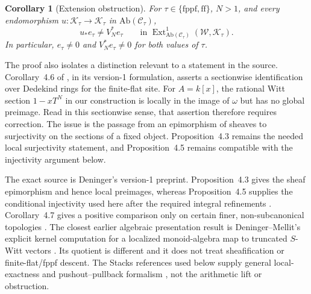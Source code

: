 \documentclass[11pt]{article}
\newtheorem{corollary}[theorem]{Corollary}
\theoremstyle{definition}
\newcommand{\Ext}{\operatorname{Ext}}
\newcommand{\Wsh}{\mathcal W}
\newcommand{\Ksh}{\mathcal K}
\newcommand{\ff}{\mathrm{ff}}
\newcommand{\fppf}{\mathrm{fppf}}
\begin{document}
\begin{corollary}[Extension obstruction]\label{cor:ext}
For \(\tau\in\{\fppf,\ff\}\), \(N>1\), and every endomorphism
\(u\colon\Ksh_\tau\to\Ksh_\tau\) in
\(\mathrm{Ab}(\mathscr C_\tau)\),
\[
 u_*e_\tau\ne V_N^*e_\tau
 \qquad\text{in }
 \Ext^1_{\mathrm{Ab}(\mathscr C_\tau)}(\Wsh,\Ksh_\tau).
\]
In particular, \(e_\tau\ne0\) and \(V_N^*e_\tau\ne0\) for both values of
\(\tau\).
\end{corollary}

The proof also isolates a distinction relevant to a statement in the
source.  Corollary~4.6 of
\cite[p.~23]{Deninger2025Rational}, in its version-1 formulation, asserts a
sectionwise identification over Dedekind rings for the finite-flat site.
For \(A=k[x]\), the rational Witt section \(1-xT^N\) in our construction is
locally in the image of \(\omega\) but has no global preimage.  Read in this
sectionwise sense, that assertion therefore requires correction.  The
issue is the passage from an epimorphism of sheaves to surjectivity on the
sections of a fixed object.  Proposition~4.3 remains the needed local
surjectivity statement, and Proposition~4.5 remains compatible with the
injectivity argument below.

The exact source is Deninger's version-1 preprint.
Proposition~4.3 gives the sheaf epimorphism and hence local preimages,
whereas Proposition~4.5 supplies the conditional injectivity used here
after the required integral refinements
\cite[Props.~4.3 and~4.5, pp.~21--23]{Deninger2025Rational}.
Corollary~4.7 gives a positive comparison only on certain finer,
non-subcanonical topologies
\cite[Cor.~4.7, p.~24]{Deninger2025Rational}.  The closest earlier
algebraic presentation result is Deninger--Mellit's explicit kernel
computation for a localized monoid-algebra map to truncated \(S\)-Witt
vectors \cite[Thm.~1.1]{DeningerMellit2019}.  Its quotient is different
and it does not treat sheafification or finite-flat/fppf descent.  The
Stacks references used below supply general local-exactness and
pushout--pullback formalism
\cite[Tags 03CN, 010I, and 06XP]{StacksProject}, not the arithmetic lift
or obstruction.
\end{document}
